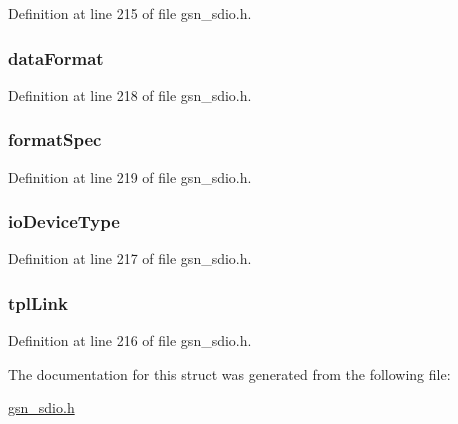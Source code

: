 Definition at line 215 of file gsn\_\-sdio.h.

\hypertarget{a00223_ae752dd447932365e49384c3e7c27e5c5}{
\subsubsection[{dataFormat}]{ {\bf dataFormat}}}
\label{a00223_ae752dd447932365e49384c3e7c27e5c5}


Definition at line 218 of file gsn\_\-sdio.h.

\hypertarget{a00223_a2366f215f23500dc9edf45590e35b028}{
\subsubsection[{formatSpec}]{ {\bf formatSpec}}}
\label{a00223_a2366f215f23500dc9edf45590e35b028}


Definition at line 219 of file gsn\_\-sdio.h.

\hypertarget{a00223_a5eaf95b34bc581c463dc891b48eb6d76}{
\subsubsection[{ioDeviceType}]{ {\bf ioDeviceType}}}
\label{a00223_a5eaf95b34bc581c463dc891b48eb6d76}


Definition at line 217 of file gsn\_\-sdio.h.

\hypertarget{a00223_a8f4c489c1bbdea21ed6588bcd2dda63e}{
\subsubsection[{tplLink}]{ {\bf tplLink}}}
\label{a00223_a8f4c489c1bbdea21ed6588bcd2dda63e}


Definition at line 216 of file gsn\_\-sdio.h.



The documentation for this struct was generated from the following file:\begin{DoxyCompactItemize}
\item 
\hyperlink{a00584}{gsn\_\-sdio.h}\end{DoxyCompactItemize}
